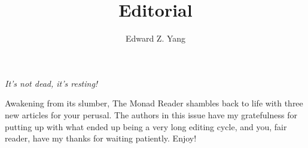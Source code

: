 \documentclass{tmr}
\title{Editorial}
\author{Edward Z. Yang\email{ezyang@mit.edu}}
\begin{document}
\noindent\textit{It's not dead, it's resting!}

Awakening from its slumber, The Monad Reader shambles back to life with
three new articles for your perusal.  The authors in this issue have my
gratefulness for putting up with what ended up being a very long editing
cycle, and you, fair reader, have my thanks for waiting patiently.
Enjoy!
\end{document}
